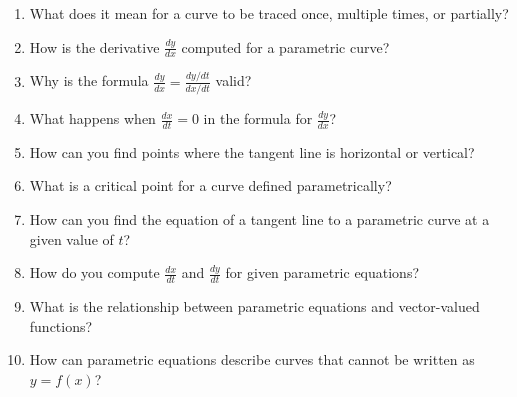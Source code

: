 \begin{enumerate}
\item What does it mean for a curve to be traced once, multiple times, or partially?

\item How is the derivative $\frac{dy}{dx}$ computed for a parametric curve?

\item Why is the formula $\frac{dy}{dx} = \frac{dy/dt}{dx/dt}$ valid?

\item What happens when $\frac{dx}{dt} = 0$ in the formula for $\frac{dy}{dx}$?

\item How can you find points where the tangent line is horizontal or vertical?

\item What is a critical point for a curve defined parametrically?

\item How can you find the equation of a tangent line to a parametric curve at a given value of $t$?

\item How do you compute $\frac{dx}{dt}$ and $\frac{dy}{dt}$ for given parametric equations?

\item What is the relationship between parametric equations and vector-valued functions?

\item How can parametric equations describe curves that cannot be written as $y=f(x)$?

\end{enumerate}
